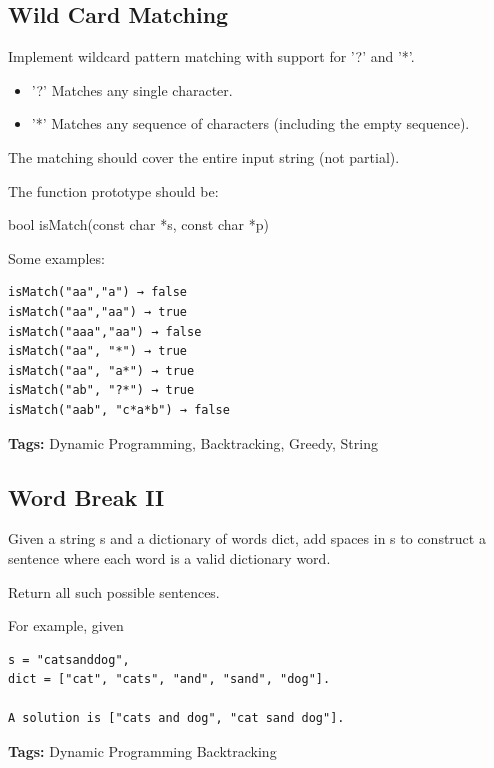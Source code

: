 \documentclass[12pt]{book}
\begin{document}
\subsection{Wild Card Matching}
\label{sec-16-4-11}
Implement wildcard pattern matching with support for '?' and '*'.
\begin{itemize}
\item '?' Matches any single character.
\item '*' Matches any sequence of characters (including the empty sequence).
\end{itemize}

The matching should cover the entire input string (not partial).

The function prototype should be:

bool isMatch(const char *s, const char *p)

Some examples:
\lstset{language=java,label= ,caption= ,numbers=none}
\begin{lstlisting}
isMatch("aa","a") → false
isMatch("aa","aa") → true
isMatch("aaa","aa") → false
isMatch("aa", "*") → true
isMatch("aa", "a*") → true
isMatch("ab", "?*") → true
isMatch("aab", "c*a*b") → false
\end{lstlisting}
\textbf{Tags:} Dynamic Programming, Backtracking, Greedy, String
\subsection{Word Break II}
\label{sec-16-4-12}
Given a string s and a dictionary of words dict, add spaces in s to construct a sentence where each word is a valid dictionary word.

Return all such possible sentences.

For example, given
\lstset{language=java,label= ,caption= ,numbers=none}
\begin{lstlisting}
s = "catsanddog",
dict = ["cat", "cats", "and", "sand", "dog"].

A solution is ["cats and dog", "cat sand dog"].
\end{lstlisting}
\textbf{Tags:} Dynamic Programming Backtracking
\end{document}
